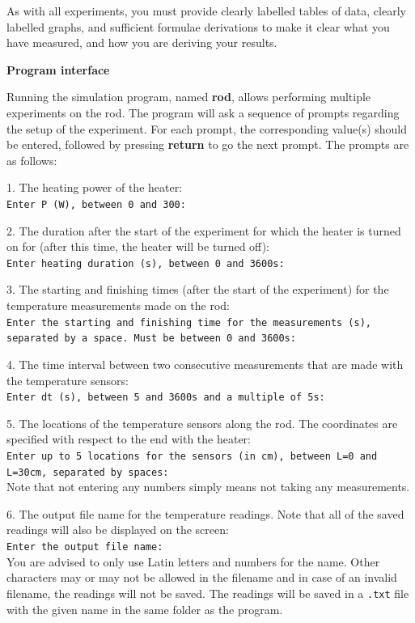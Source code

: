 As with all experiments, you must provide clearly labelled tables of data,
clearly labelled graphs, and sufficient formulae derivations to make it clear
what you have measured, and how you are deriving your results.

\textbf{Program interface}

Running the simulation program, named \textbf{rod}, allows performing multiple
experiments on the rod. The program will ask a sequence of prompts regarding the
setup of the experiment. For each prompt, the corresponding value(s) should be
entered, followed by pressing \textbf{return} to go the next prompt. The prompts
are as follows:

1. The heating power of the heater:\\
\texttt{Enter P (W), between 0 and 300:}

2. The duration after the start of the experiment for which the heater is
turned on for (after this time, the heater will be turned off):\\
\texttt{Enter heating duration (s), between 0 and 3600s:}

3. The starting and finishing times (after the start of the experiment) for the
temperature measurements made on the rod:\\
\texttt{Enter the starting and finishing time for the measurements (s),
separated by a space. Must be between 0 and 3600s:}

4. The time interval between two consecutive measurements that are made with
the temperature sensors:\\
\texttt{Enter dt (s), between 5 and 3600s and a multiple of 5s:}

5. The locations of the temperature sensors along the rod. The coordinates are
specified with respect to the end with the heater:\\
\texttt{Enter up to 5 locations for the sensors (in cm), between L=0 and
L=30cm, separated by spaces:}\\
Note that not entering any numbers simply means not taking any measurements.

6. The output file name for the temperature readings. Note that all of the
saved readings will also be displayed on the screen:\\
\texttt{Enter the output file name:}\\
You are advised to only use Latin letters and numbers for the name. Other
characters may or may not be allowed in the filename and in case of an invalid
filename, the readings will not be saved. The readings will be saved in a
\texttt{.txt} file with the given name in the same folder as the program.


